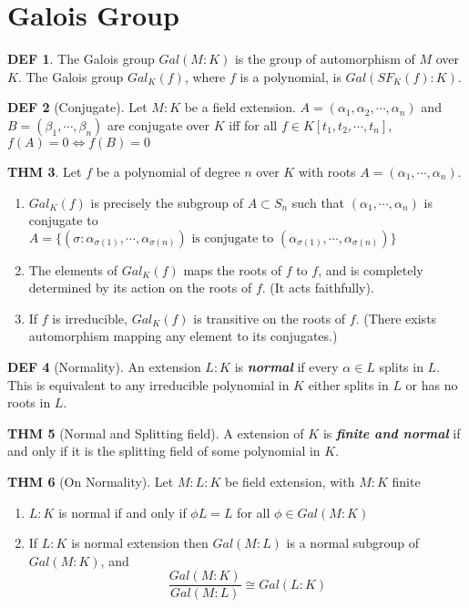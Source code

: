 \documentclass[twocolumn]{article}
\renewcommand{\emph}[1]{\textbf{\textit{#1}}}
\theoremstyle{definition}
\newtheorem{thm}{THM}
\newtheorem{defi}[thm]{DEF}
\theoremstyle{remark}
\begin{document}
\section{Galois Group}

\begin{defi}
	The Galois group $Gal(M:K)$ is the group of automorphism of $M$ over $K$.
	The Galois group $Gal_K(f)$, where $f$ is a polynomial, is $Gal(SF_{K}(f):K)$.
\end{defi}

\begin{defi}[Conjugate]
	Let $M:K$ be a field extension. $A = (\alpha_1, \alpha_2, \cdots, \alpha_n)$ and $B = (\beta_1, \cdots, \beta_n)$ are conjugate over $K$ iff for all $f \in K[t_1, t_2, \cdots, t_n]$, $f(A) = 0 \iff f(B) = 0$
\end{defi}

\begin{thm}
	Let $f$ be a polynomial of degree $n$ over $K$ with roots $A = (\alpha_1, \cdots, \alpha_n)$.
	\begin{enumerate} 
		\item $Gal_K(f)$ is precisely the subgroup of $A \subset S_n$ such that 
			$(\alpha_1, \cdots, \alpha_n)$ is conjugate to $A = \{(\sigma: \alpha_{\sigma(1)}, \cdots, \alpha_{\sigma(n)}) \text{ is conjugate to } (\alpha_{\sigma(1)}, \cdots, \alpha_{\sigma(n)})\}$
		\item The elements of $Gal_K(f)$ maps the roots of $f$ to $f$, and is completely determined by its action on the roots of $f$. (It acts faithfully).
		\item If $f$ is irreducible, $Gal_K(f)$ is transitive on the roots of $f$. (There exists automorphism mapping any element to its conjugates.)
	\end{enumerate}
\end{thm}

\begin{defi}[Normality]
	An extension $L:K$ is \emph{normal} if every $\alpha \in L$ splits in $L$. 
	This is equivalent to any irreducible polynomial in $K$ either splits in $L$ or has no roots in $L$.
\end{defi}

\begin{thm}[Normal and Splitting field]
	A extension of $K$ is \emph{finite and normal} if and only if it is the splitting field of some polynomial in $K$.
\end{thm}

\begin{thm}[On Normality]
	Let $M:L:K$ be field extension, with $M:K$ finite
	\begin{enumerate}
		\item $L:K$ is normal if and only if $\phi L = L$ for all $\phi \in Gal(M:K)$
		\item If $L:K$ is normal extension then $Gal(M:L)$ is a normal subgroup of $Gal(M:K)$, and 
			$$
				\frac{Gal(M:K)}{Gal(M:L)} \cong Gal(L:K)
			$$
	\end{enumerate}
\end{thm}
\end{document}
